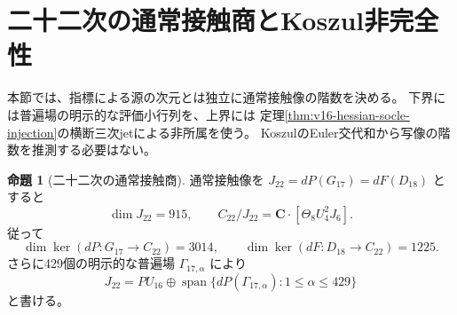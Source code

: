 \documentclass[a4paper,11pt]{ltjsarticle}
\theoremstyle{definition}
\newtheorem{proposition}[theorem]{命題}
\begin{document}


\section{二十二次の通常接触商とKoszul非完全性}
\label{sec:v16-contact-rank}

本節では、指標による源の次元とは独立に通常接触像の階数を決める。
下界には普遍場の明示的な評価小行列を、上界には
定理\ref{thm:v16-hessian-socle-injection}の横断三次jetによる非所属を使う。
KoszulのEuler交代和から写像の階数を推測する必要はない。

\begin{proposition}[二十二次の通常接触商]
\label{prop:v16-contact-rank-twenty-second}
通常接触像を $J_{22}=dP(G_{17})=dF(D_{18})$ とすると
\[
 \dim J_{22}=915,\qquad
 C_{22}/J_{22}=\mathbf C\cdot[\Theta_8U_4^2J_6].
\]
従って
\[
 \dim\ker(dP:G_{17}\to C_{22})=3014,\qquad
 \dim\ker(dF:D_{18}\to C_{22})=1225.
\]
さらに429個の明示的な普遍場 $\Gamma_{17,\alpha}$ により
\[
 J_{22}=P U_{16}\oplus
 \operatorname{span}\{dP(\Gamma_{17,\alpha}):1\leq\alpha\leq429\}
\]
と書ける。
\end{proposition}
\end{document}
